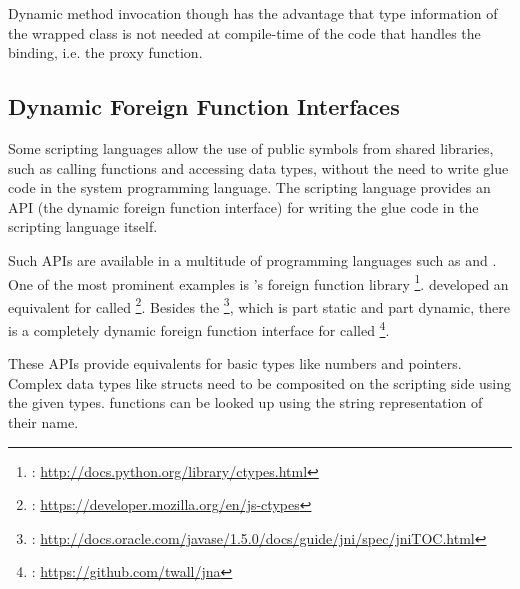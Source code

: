 Dynamic method invocation though has the advantage that type information of the wrapped class is not needed at compile-time of the code that handles the binding, i.e. the proxy function.


\subsection{Dynamic Foreign Function Interfaces}
\label{sec:DynamicFFI}

Some scripting languages allow the use of public symbols from shared libraries, such as calling functions and accessing data types, without the need to write glue code in the system programming language. The scripting language provides an API (the dynamic foreign function interface) for writing the glue code in the scripting language itself.

Such APIs are available in a multitude of programming languages such as  and . One of the most prominent examples is 's foreign function library \footnote{: \url{http://docs.python.org/library/ctypes.html}}.  developed an equivalent for  called \footnote{: \url{https://developer.mozilla.org/en/js-ctypes}}. Besides the \footnote{: \url{http://docs.oracle.com/javase/1.5.0/docs/guide/jni/spec/jniTOC.html}}, which is part static and part dynamic, there is a completely dynamic foreign function interface for  called \footnote{: \url{https://github.com/twall/jna}}.

These APIs provide equivalents for basic  types like numbers and pointers. Complex data types like structs need to be composited on the scripting side using the given types.  functions can be looked up using the string representation of their name.

